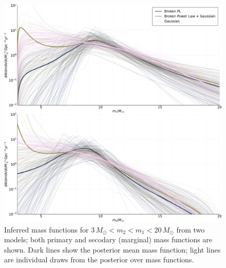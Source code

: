 \documentclass[modern]{aastex631}
\begin{document}
\begin{figure}
    \includegraphics[width=\columnwidth]{figures/dNdm_traces.pdf}
    \caption{\label{fig:dNdm-traces} Inferred mass functions for $3 \, M_\odot <
    m_2 < m_1 < 20 \, M_\odot$ from two models; both primary and secodary
    (marginal) mass functions are shown.  Dark lines show the posterior mean
    mass function; light lines are individual draws from the posterior over mass
    functions.}
\end{figure}
\end{document}
